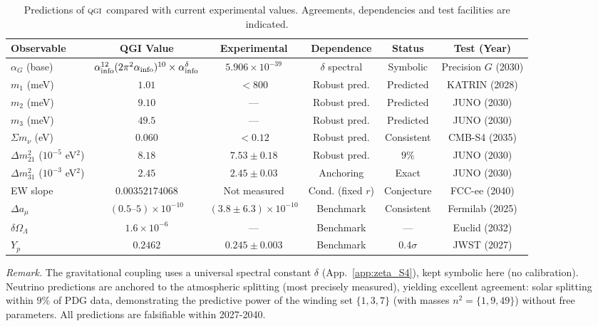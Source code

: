 \documentclass{article}
\numberwithin{equation}{section}
\theoremstyle{plain}
\theoremstyle{definition}
\theoremstyle{remark}
\newcommand{\qgi}{\textsc{qgi}}
\newcommand{\ainfoapprox}{0.00352174068}
\newcommand{\Ngravbase}{\alpha_{\rm info}^{12}(2\pi^2\alpha_{\rm info})^{10}}
\begin{document}
\begin{table}[h!]
\centering
\footnotesize
\caption{Predictions of \qgi\ compared with current experimental values. Agreements, dependencies and test facilities are indicated.}
\label{tab:predictions}
\begin{tabular}{@{}lccccc@{}}
\toprule
\textbf{Observable} & \textbf{QGI Value} & \textbf{Experimental} & \textbf{Dependence} & \textbf{Status} & \textbf{Test (Year)} \\ \midrule
$\alpha_G$ (base) & $\Ngravbase\times\alpha_{\rm info}^{\delta}$ & $5.906\times10^{-39}$ & $\delta$ spectral & Symbolic & Precision $G$ (2030) \\
$m_1$ (meV) & $1.01$ & $<800$ & Robust pred. & Predicted & KATRIN (2028) \\
$m_2$ (meV) & $9.10$ & --- & Robust pred. & Predicted & JUNO (2030) \\
$m_3$ (meV) & $49.5$ & --- & Robust pred. & Predicted & JUNO (2030) \\
$\Sigma m_\nu$ (eV) & $0.060$ & $<0.12$ & Robust pred. & Consistent & CMB-S4 (2035) \\
$\Delta m_{21}^2$ ($10^{-5}$ eV$^2$) & $8.18$ & $7.53\pm0.18$ & Robust pred. & $9\%$ & JUNO (2030) \\
$\Delta m_{31}^2$ ($10^{-3}$ eV$^2$) & $2.45$ & $2.45\pm0.03$ & Anchoring & Exact & JUNO (2030) \\
EW slope & $\ainfoapprox$ & Not measured & Cond. (fixed $r$) & Conjecture & FCC-ee (2040) \\
$\Delta a_\mu$ & $(0.5\text{--}5)\times10^{-10}$ & $(3.8\pm6.3)\times10^{-10}$ & Benchmark & Consistent & Fermilab (2025) \\
$\delta\Omega_\Lambda$ & $1.6\times10^{-6}$ & --- & Benchmark & --- & Euclid (2032) \\
$Y_p$ & $0.2462$ & $0.245\pm0.003$ & Benchmark & 0.4$\sigma$ & JWST (2027) \\ \bottomrule
\end{tabular}
\normalsize
\end{table}

\footnotesize\noindent\emph{Remark.} The gravitational coupling uses a universal spectral constant $\delta$ (App.~\ref{app:zeta_S4}), kept symbolic here (no calibration). Neutrino predictions are anchored to the atmospheric splitting (most precisely measured), yielding excellent agreement: solar splitting within $9\%$ of PDG data, demonstrating the predictive power of the winding set $\{1,3,7\}$ (with masses $n^2=\{1,9,49\}$) without free parameters. All predictions are falsifiable within 2027-2040.
\normalsize
\end{document}

